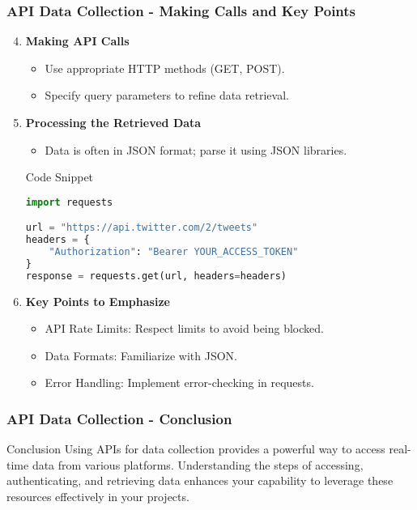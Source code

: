 \documentclass{beamer}
\begin{document}
\begin{frame}[fragile]
    \frametitle{API Data Collection - Making Calls and Key Points}
    \begin{enumerate}
        \setcounter{enumi}{3}
        \item \textbf{Making API Calls}
        \begin{itemize}
            \item Use appropriate HTTP methods (GET, POST).
            \item Specify query parameters to refine data retrieval.
        \end{itemize}

        \item \textbf{Processing the Retrieved Data}
        \begin{itemize}
            \item Data is often in JSON format; parse it using JSON libraries.
        \end{itemize}

        \begin{exampleblock}{Code Snippet}
            \begin{lstlisting}[language=Python]
import requests

url = "https://api.twitter.com/2/tweets"
headers = {
    "Authorization": "Bearer YOUR_ACCESS_TOKEN"
}
response = requests.get(url, headers=headers)
            \end{lstlisting}
        \end{exampleblock}

        \item \textbf{Key Points to Emphasize}
        \begin{itemize}
            \item API Rate Limits: Respect limits to avoid being blocked.
            \item Data Formats: Familiarize with JSON.
            \item Error Handling: Implement error-checking in requests.
        \end{itemize}
    \end{enumerate}
\end{frame}

\begin{frame}[fragile]
    \frametitle{API Data Collection - Conclusion}
    \begin{block}{Conclusion}
        Using APIs for data collection provides a powerful way to access real-time data from various platforms. Understanding the steps of accessing, authenticating, and retrieving data enhances your capability to leverage these resources effectively in your projects.
    \end{block}
\end{frame}
\end{document}
